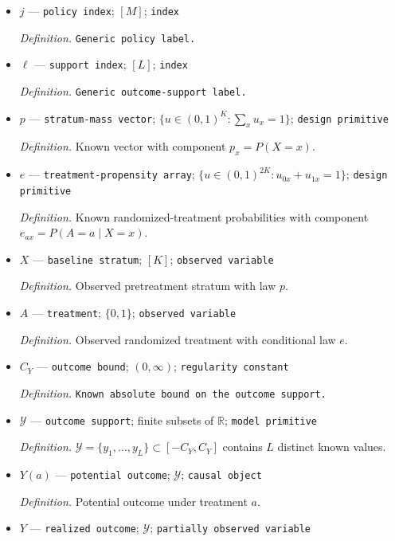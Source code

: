 \documentclass{article}
\begin{document}
\begin{itemize}
  \par\smallskip\noindent\emph{Definition.} \texttt{Generic binary treatment level.}
  \item \(j\) --- \texttt{policy index}; \([M]\); \texttt{index}
  \par\smallskip\noindent\emph{Definition.} \texttt{Generic policy label.}
  \item \(\ell\) --- \texttt{support index}; \([L]\); \texttt{index}
  \par\smallskip\noindent\emph{Definition.} \texttt{Generic outcome-\allowbreak{}support label.}
  \item \(p\) --- \texttt{stratum-\allowbreak{}mass vector}; \(\{u\in(0,1)^K:\sum_x u_x=1\}\); \texttt{design primitive}
  \par\smallskip\noindent\emph{Definition.} Known vector with component \(p_x=P(X=x)\).
  \item \(e\) --- \texttt{treatment-\allowbreak{}propensity array}; \(\{u\in(0,1)^{2K}:u_{0x}+u_{1x}=1\}\); \texttt{design primitive}
  \par\smallskip\noindent\emph{Definition.} Known randomized-treatment probabilities with component \(e_{ax}=P(A=a\mid X=x)\).
  \item \(X\) --- \texttt{baseline stratum}; \([K]\); \texttt{observed variable}
  \par\smallskip\noindent\emph{Definition.} Observed pretreatment stratum with law \(p\).
  \item \(A\) --- \texttt{treatment}; \(\{0,1\}\); \texttt{observed variable}
  \par\smallskip\noindent\emph{Definition.} Observed randomized treatment with conditional law \(e\).
  \item \(C_Y\) --- \texttt{outcome bound}; \((0,\infty)\); \texttt{regularity constant}
  \par\smallskip\noindent\emph{Definition.} \texttt{Known absolute bound on the outcome support.}
  \item \(\mathcal Y\) --- \texttt{outcome support}; finite subsets of \(\mathbb R\); \texttt{model primitive}
  \par\smallskip\noindent\emph{Definition.} \(\mathcal Y=\{y_1,\ldots,y_L\}\subset[-C_Y,C_Y]\) contains \(L\) distinct known values.
  \item \(Y(a)\) --- \texttt{potential outcome}; \(\mathcal Y\); \texttt{causal object}
  \par\smallskip\noindent\emph{Definition.} Potential outcome under treatment \(a\).
  \item \(Y\) --- \texttt{realized outcome}; \(\mathcal Y\); \texttt{partially observed variable}

\end{itemize}
\end{document}
